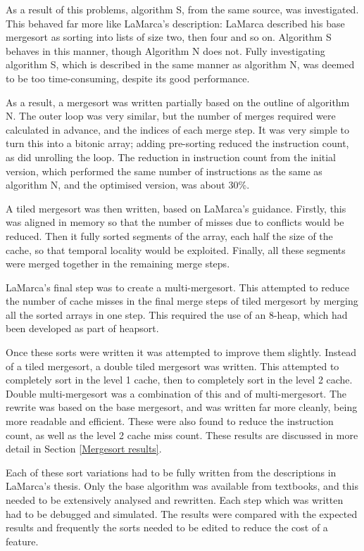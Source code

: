 As a result of this problems, algorithm S, from the same source, was
investigated. This behaved far more like LaMarca's description: LaMarca
described his base mergesort as sorting into lists of size two, then four and
so on. Algorithm S behaves in this manner, though Algorithm N does not. Fully
investigating algorithm S, which is described in the same manner as algorithm N,
was deemed to be too time-consuming, despite its good performance.

As a result, a mergesort was written partially based on the outline of algorithm
N. The outer loop was very similar, but the number of merges required were
calculated in advance, and the indices of each merge step.  It was very simple
to turn this into a bitonic array; adding pre-sorting reduced the instruction
count, as did unrolling the loop. The reduction in instruction count from the
initial version, which performed the same number of instructions as the same as
algorithm N, and the optimised version, was about 30\%.

A tiled mergesort was then written, based on LaMarca's guidance. Firstly, this
was aligned in memory so that the number of misses due to conflicts would be
reduced.  Then it fully sorted segments of the array, each half the size of the
cache, so that temporal locality would be exploited. Finally, all these segments
were merged together in the remaining merge steps.

LaMarca's final step was to create a multi-mergesort. This attempted to reduce
the number of cache misses in the final merge steps of tiled mergesort by
merging all the sorted arrays in one step. This required the use of an 8-heap,
which had been developed as part of heapsort.

Once these sorts were written it was attempted to improve them slightly.
Instead of a tiled mergesort, a double tiled mergesort was written.  This
attempted to completely sort in the level 1 cache, then to completely sort in
the level 2 cache. Double multi-mergesort was a combination of this and of
multi-mergesort. The rewrite was based on the base mergesort, and was written
far more cleanly, being more readable and efficient. These were also found to
reduce the instruction count, as well as the level 2 cache miss count. These
results are discussed in more detail in Section \ref{Mergesort results}.

Each of these sort variations had to be fully written from the descriptions in
LaMarca's thesis. Only the base algorithm was available from textbooks, and this
needed to be extensively analysed and rewritten. Each step which was written had
to be debugged and simulated. The results were compared with the expected
results and frequently the sorts needed to be edited to reduce the cost of a
feature.


